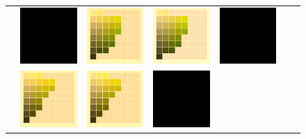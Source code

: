 \begin{figure}[t!]
{\begin{tabular}{ccccccc}
			& 
			\includegraphics[width=.155\linewidth]{img/toDelete.png}
			&\quad
			\includegraphics[width=.155\linewidth]{img/results_uplift_page14_originalFL11.png}
			&
			\includegraphics[width=.155\linewidth]{img/results_uplift_page14_sigmoidFL11.png}
			&
			\includegraphics[width=.155\linewidth]{img/toDelete.png}
			\\ \raisebox{0.5cm}[0pt][0pt]{\parbox[c][0pt][c]{0cm}{\hspace{-1.5em}\\[20pt]}\par}
			&
			\includegraphics[width=.155\linewidth]{img/results_uplift_page13_originalFL11.png}
			&
			\includegraphics[width=.155\linewidth]{img/results_uplift_page13_ourFL11.png}
			& 
			\includegraphics[width=.155\linewidth]{img/toDelete.png}

\end{tabular}}
\end{figure}
